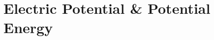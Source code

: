 \documentclass[12pt,aspectratio=169]{beamer}
\begin{document}
%
%    
%
%
%
%
%
%
%    
%
%
%




\section{Electric Potential \& Potential Energy}
\end{document}
